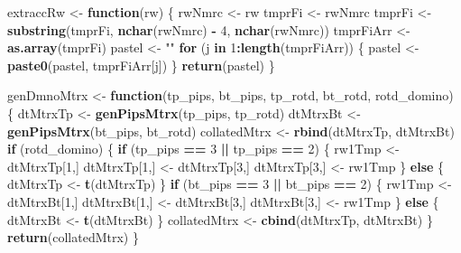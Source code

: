 \documentclass[
]{article}
\newenvironment{Shaded}{\begin{snugshade}}{\end{snugshade}}
\newcommand{\ControlFlowTok}[1]{\textcolor[rgb]{0.13,0.29,0.53}{\textbf{#1}}}
\newcommand{\DecValTok}[1]{\textcolor[rgb]{0.00,0.00,0.81}{#1}}
\newcommand{\FunctionTok}[1]{\textcolor[rgb]{0.13,0.29,0.53}{\textbf{#1}}}
\newcommand{\NormalTok}[1]{#1}
\newcommand{\OtherTok}[1]{\textcolor[rgb]{0.56,0.35,0.01}{#1}}
\newcommand{\SpecialCharTok}[1]{\textcolor[rgb]{0.81,0.36,0.00}{\textbf{#1}}}
\newcommand{\StringTok}[1]{\textcolor[rgb]{0.31,0.60,0.02}{#1}}
\begin{document}
\begin{Shaded}
\begin{Highlighting}[]
\NormalTok{extraccRw }\OtherTok{\textless{}{-}} \ControlFlowTok{function}\NormalTok{(rw) \{}
\NormalTok{    rwNmrc }\OtherTok{\textless{}{-}}\NormalTok{ rw}
\NormalTok{    tmprFi }\OtherTok{\textless{}{-}}\NormalTok{ rwNmrc}
\NormalTok{    tmprFi }\OtherTok{\textless{}{-}} \FunctionTok{substring}\NormalTok{(tmprFi, }\FunctionTok{nchar}\NormalTok{(rwNmrc) }\SpecialCharTok{{-}} \DecValTok{4}\NormalTok{, }\FunctionTok{nchar}\NormalTok{(rwNmrc))}
\NormalTok{    tmprFiArr }\OtherTok{\textless{}{-}} \FunctionTok{as.array}\NormalTok{(tmprFi)}
\NormalTok{    pastel }\OtherTok{\textless{}{-}} \StringTok{""}
    \ControlFlowTok{for}\NormalTok{ (j }\ControlFlowTok{in} \DecValTok{1}\SpecialCharTok{:}\FunctionTok{length}\NormalTok{(tmprFiArr)) \{}
\NormalTok{      pastel }\OtherTok{\textless{}{-}} \FunctionTok{paste0}\NormalTok{(pastel, tmprFiArr[j])}
\NormalTok{    \}}
    \FunctionTok{return}\NormalTok{(pastel)}
\NormalTok{\}}


\NormalTok{genDmnoMtrx }\OtherTok{\textless{}{-}} \ControlFlowTok{function}\NormalTok{(tp\_pips, bt\_pips, tp\_rotd, bt\_rotd, rotd\_domino) \{}
\NormalTok{  dtMtrxTp }\OtherTok{\textless{}{-}} \FunctionTok{genPipsMtrx}\NormalTok{(tp\_pips, tp\_rotd)}
\NormalTok{  dtMtrxBt }\OtherTok{\textless{}{-}} \FunctionTok{genPipsMtrx}\NormalTok{(bt\_pips, bt\_rotd)}
\NormalTok{  collatedMtrx }\OtherTok{\textless{}{-}} \FunctionTok{rbind}\NormalTok{(dtMtrxTp, dtMtrxBt)}
  \ControlFlowTok{if}\NormalTok{ (rotd\_domino) \{}
    \ControlFlowTok{if}\NormalTok{ (tp\_pips }\SpecialCharTok{==} \DecValTok{3} \SpecialCharTok{||}\NormalTok{ tp\_pips }\SpecialCharTok{==} \DecValTok{2}\NormalTok{) \{}
\NormalTok{      rw1Tmp }\OtherTok{\textless{}{-}}\NormalTok{ dtMtrxTp[}\DecValTok{1}\NormalTok{,]}
\NormalTok{      dtMtrxTp[}\DecValTok{1}\NormalTok{,] }\OtherTok{\textless{}{-}}\NormalTok{ dtMtrxTp[}\DecValTok{3}\NormalTok{,]}
\NormalTok{      dtMtrxTp[}\DecValTok{3}\NormalTok{,] }\OtherTok{\textless{}{-}}\NormalTok{ rw1Tmp}
\NormalTok{    \} }\ControlFlowTok{else}\NormalTok{ \{}
\NormalTok{      dtMtrxTp }\OtherTok{\textless{}{-}} \FunctionTok{t}\NormalTok{(dtMtrxTp)}
\NormalTok{    \}}
    \ControlFlowTok{if}\NormalTok{ (bt\_pips }\SpecialCharTok{==} \DecValTok{3} \SpecialCharTok{||}\NormalTok{ bt\_pips }\SpecialCharTok{==} \DecValTok{2}\NormalTok{) \{}
\NormalTok{      rw1Tmp }\OtherTok{\textless{}{-}}\NormalTok{ dtMtrxBt[}\DecValTok{1}\NormalTok{,]}
\NormalTok{      dtMtrxBt[}\DecValTok{1}\NormalTok{,] }\OtherTok{\textless{}{-}}\NormalTok{ dtMtrxBt[}\DecValTok{3}\NormalTok{,]}
\NormalTok{      dtMtrxBt[}\DecValTok{3}\NormalTok{,] }\OtherTok{\textless{}{-}}\NormalTok{ rw1Tmp}
\NormalTok{    \} }\ControlFlowTok{else}\NormalTok{ \{}
\NormalTok{      dtMtrxBt }\OtherTok{\textless{}{-}} \FunctionTok{t}\NormalTok{(dtMtrxBt)}
\NormalTok{    \}}
\NormalTok{    collatedMtrx }\OtherTok{\textless{}{-}} \FunctionTok{cbind}\NormalTok{(dtMtrxTp, dtMtrxBt)}
\NormalTok{  \}}
  \FunctionTok{return}\NormalTok{(collatedMtrx)}
\NormalTok{\}}


\end{Highlighting}
\end{Shaded}
\end{document}
